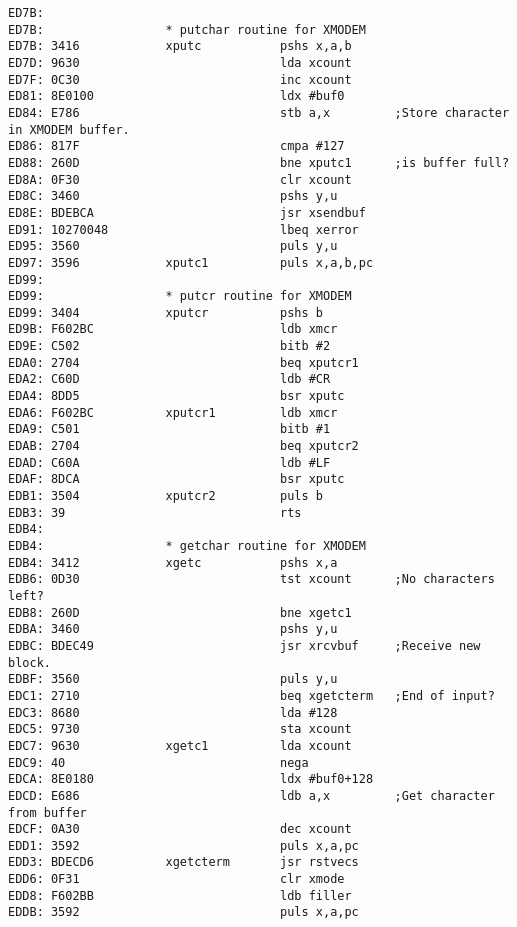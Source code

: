 {\begin{verbatim}
ED7B:                 
ED7B:                 * putchar routine for XMODEM 
ED7B: 3416            xputc           pshs x,a,b
ED7D: 9630                            lda xcount
ED7F: 0C30                            inc xcount
ED81: 8E0100                          ldx #buf0
ED84: E786                            stb a,x         ;Store character in XMODEM buffer.
ED86: 817F                            cmpa #127
ED88: 260D                            bne xputc1      ;is buffer full?
ED8A: 0F30                            clr xcount
ED8C: 3460                            pshs y,u
ED8E: BDEBCA                          jsr xsendbuf    
ED91: 10270048                        lbeq xerror
ED95: 3560                            puls y,u
ED97: 3596            xputc1          puls x,a,b,pc                   
ED99:                 
ED99:                 * putcr routine for XMODEM
ED99: 3404            xputcr          pshs b
ED9B: F602BC                          ldb xmcr
ED9E: C502                            bitb #2
EDA0: 2704                            beq xputcr1
EDA2: C60D                            ldb #CR
EDA4: 8DD5                            bsr xputc
EDA6: F602BC          xputcr1         ldb xmcr
EDA9: C501                            bitb #1
EDAB: 2704                            beq xputcr2
EDAD: C60A                            ldb #LF
EDAF: 8DCA                            bsr xputc               
EDB1: 3504            xputcr2         puls b
EDB3: 39                              rts
EDB4:                 
EDB4:                 * getchar routine for XMODEM
EDB4: 3412            xgetc           pshs x,a
EDB6: 0D30                            tst xcount      ;No characters left?
EDB8: 260D                            bne xgetc1
EDBA: 3460                            pshs y,u
EDBC: BDEC49                          jsr xrcvbuf     ;Receive new block.
EDBF: 3560                            puls y,u
EDC1: 2710                            beq xgetcterm   ;End of input?          
EDC3: 8680                            lda #128
EDC5: 9730                            sta xcount
EDC7: 9630            xgetc1          lda xcount
EDC9: 40                              nega
EDCA: 8E0180                          ldx #buf0+128
EDCD: E686                            ldb a,x         ;Get character from buffer
EDCF: 0A30                            dec xcount
EDD1: 3592                            puls x,a,pc             
EDD3: BDECD6          xgetcterm       jsr rstvecs
EDD6: 0F31                            clr xmode
EDD8: F602BB                          ldb filler
EDDB: 3592                            puls x,a,pc

\end{verbatim}}
